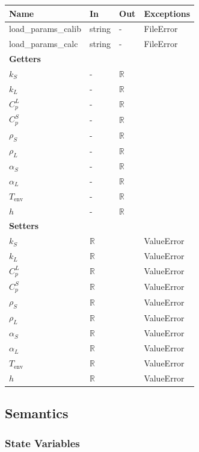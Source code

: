 \documentclass[12pt, titlepage]{article}
\begin{document}
\begin{tabular}{p{3cm} p{3cm} p{1cm} >{\raggedright\arraybackslash}p{9cm}}
\toprule
\textbf{Name} & \textbf{In} & \textbf{Out} & \textbf{Exceptions} \\
\midrule
load\_params\_calib & string & - &  FileError \\
load\_params\_calc & string & - &  FileError \\
\midrule
\textbf{Getters} & & &\\
\midrule
$k_{S}$ & - & $\mathbb{R}$& \\
$k_{L}$ & - & $\mathbb{R}$ & \\
$C_{p}^L$ & - & $\mathbb{R}$& \\
$C_p^S$ & - & $\mathbb{R}$& \\
$\rho_S$ & - & $\mathbb{R}$& \\
$\rho_L$ & - & $\mathbb{R}$& \\
$\alpha_S$ & - & $\mathbb{R}$& \\
$\alpha_L$ & - & $\mathbb{R}$& \\
$T_{\text{env}}$ & - & $\mathbb{R}$& \\
$h$&-&$\mathbb{R}$& \\
\midrule
\textbf{Setters} & & &\\
\midrule
$k_{S}$ & $\mathbb{R}$ & & ValueError\\
$k_{L}$ & $\mathbb{R}$ & & ValueError\\
$C_{p}^L$ & $\mathbb{R}$ & & ValueError\\
$C_p^S$ & $\mathbb{R}$ & & ValueError\\
$\rho_S$ & $\mathbb{R}$ & & ValueError\\
$\rho_L$ & $\mathbb{R}$ & & ValueError\\
$\alpha_S$ & $\mathbb{R}$ & & ValueError\\
$\alpha_L$ & $\mathbb{R}$ & & ValueError\\
$T_{\text{env}}$ & $\mathbb{R}$ & & ValueError\\
$h$ & $\mathbb{R}$ & & ValueError\\
\bottomrule
\end{tabular}

\subsection{Semantics}

\subsubsection{State Variables}
\end{document}
